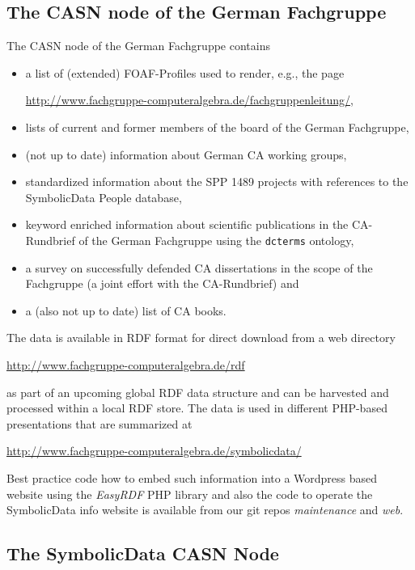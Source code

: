 \documentclass{llncs}
\newcommand{\SD}{{\sc Symbo\-lic\-Data}}
\begin{document}
\subsection*{The CASN node of the German Fachgruppe}

The CASN node of the German Fachgruppe contains  
\begin{itemize}
\item a list of (extended) FOAF-Profiles used to render, e.g., the page
  \begin{center}
    \url{http://www.fachgruppe-computeralgebra.de/fachgruppenleitung/},
  \end{center}
\item lists of current and former members of the board of the German
  Fachgruppe,
\item (not up to date) information about German CA working groups, 
\item standardized information about the SPP 1489 projects with references to
  the {\SD} People database,
\item keyword enriched information about scientific publications in the
  CA-Rund\-brief of the German Fachgruppe using the \texttt{dcterms} ontology,
\item a survey on successfully defended CA dissertations in the scope of the
  Fachgruppe (a joint effort with the CA-Rundbrief) and
\item a (also not up to date) list of CA books.
\end{itemize}
The data is available in RDF format for direct download from a web directory
\begin{center}
  \url{http://www.fachgruppe-computeralgebra.de/rdf}
\end{center}
as part of an upcoming global RDF data structure and can be harvested and
processed within a local RDF store. The data is used in different PHP-based
presentations that are summarized at
\begin{center}
  \url{http://www.fachgruppe-computeralgebra.de/symbolicdata/}
\end{center}
Best practice code how to embed such information into a Wordpress based
website using the \emph{EasyRDF} PHP library and also the code to operate the
{\SD} info website \cite{sdinfo} is available from our git repos
\emph{maintenance} and \emph{web}.

\subsection*{The {\SD} CASN Node}
\end{document}
